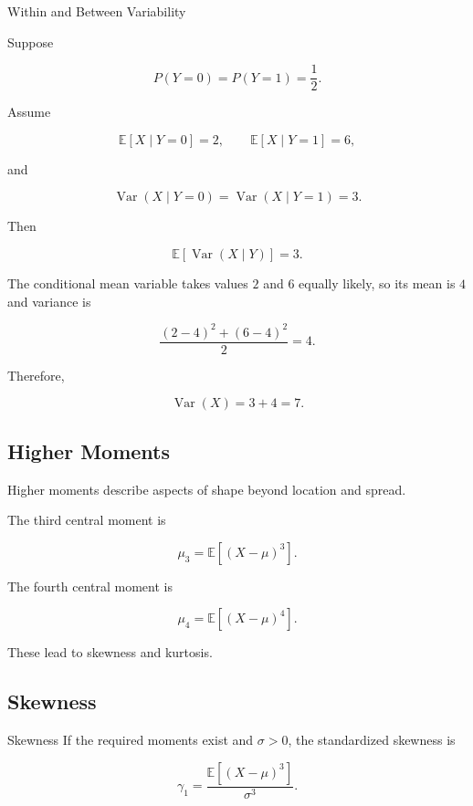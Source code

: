 \begin{workedexamplebox}{Within and Between Variability}

Suppose

\[
P(Y=0)=P(Y=1)=\frac12.
\]

Assume

\[
\mathbb{E}[X\mid Y=0]=2,
\qquad
\mathbb{E}[X\mid Y=1]=6,
\]

and

\[
\operatorname{Var}(X\mid Y=0)
=
\operatorname{Var}(X\mid Y=1)
=
3.
\]

Then

\[
\mathbb{E}[\operatorname{Var}(X\mid Y)]
=
3.
\]

The conditional mean variable takes values \(2\) and \(6\) equally
likely, so its mean is \(4\) and variance is

\[
\frac{
(2-4)^2+(6-4)^2
}{2}
=
4.
\]

Therefore,

\begin{answerbox}
\[
\boxed{
\operatorname{Var}(X)
=
3+4
=
7.
}
\]
\end{answerbox}

\end{workedexamplebox}

\subsection{Higher Moments}
\label{subsec:higher-moments}

Higher moments describe aspects of shape beyond location and spread.

The third central moment is

\[
\boxed{
\mu_3
=
\mathbb{E}
\left[
(X-\mu)^3
\right].
}
\]

The fourth central moment is

\[
\boxed{
\mu_4
=
\mathbb{E}
\left[
(X-\mu)^4
\right].
}
\]

These lead to skewness and kurtosis.

\subsection{Skewness}
\label{subsec:skewness}

\begin{definitionbox}{Skewness}
If the required moments exist and \(\sigma>0\), the standardized
skewness is

\[
\boxed{
\gamma_1
=
\frac{
\mathbb{E}[(X-\mu)^3]
}{
\sigma^3
}.
}
\]
\end{definitionbox}

